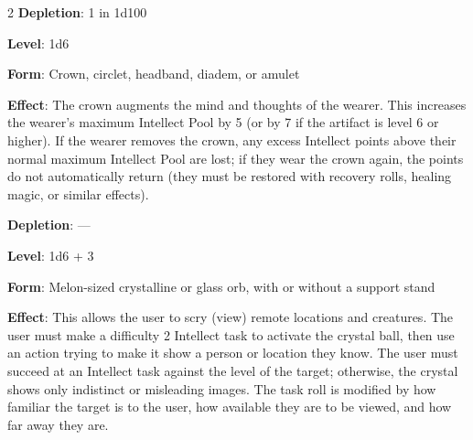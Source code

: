 \begin{multicols}{2}
\textbf{Depletion}: 1 in 1d100


\textbf{Level}: 1d6 

\textbf{Form}: Crown, circlet, headband, diadem, or amulet 

\textbf{Effect}: The crown augments the mind and thoughts of the wearer. This increases the wearer’s maximum Intellect Pool by 5 (or by 7 if the artifact is level 6 or higher). If the wearer removes the crown, any excess Intellect points above their normal maximum Intellect Pool are lost; if they wear the crown again, the points do not automatically return (they must be restored with recovery rolls, healing magic, or similar effects). 

\textbf{Depletion}: — 


\textbf{Level}: 1d6 + 3 

\textbf{Form}: Melon-sized crystalline or glass orb, with or without a support stand 

\textbf{Effect}: This allows the user to scry (view) remote locations and creatures. The user must make a difficulty 2 Intellect task to activate the crystal ball, then use an action trying to make it show a person or location they know. The user must succeed at an Intellect task against the level of the target; otherwise, the crystal shows only indistinct or misleading images. The task roll is modified by how familiar the target is to the user, how available they are to be viewed, and how far away they are.

\end{multicols}

